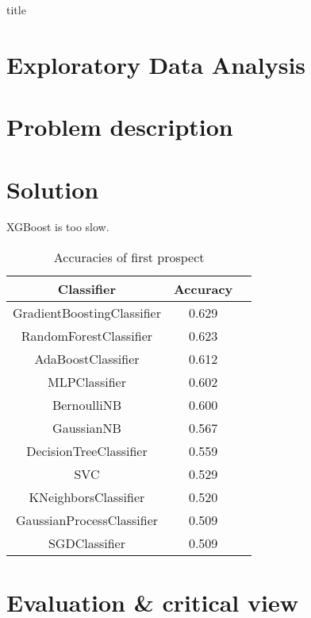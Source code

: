 \documentclass[12pt]{article}
\begin{document}
{title}


\tableofcontents
\listoffigures
\listoftables

{}

\section{Exploratory Data Analysis}
\section{Problem description}
\section{Solution}
XGBoost is too slow.

\begin{table}[h!]
    \centering
    \begin{tabular}{ccc}
        \toprule
        \textbf{Classifier}        & \textbf{Accuracy} \\ \midrule
        GradientBoostingClassifier & 0.629             \\
        RandomForestClassifier     & 0.623             \\
        AdaBoostClassifier         & 0.612             \\
        MLPClassifier              & 0.602             \\
        BernoulliNB                & 0.600             \\
        GaussianNB                 & 0.567             \\
        DecisionTreeClassifier     & 0.559             \\
        SVC                        & 0.529             \\
        KNeighborsClassifier       & 0.520             \\
        GaussianProcessClassifier  & 0.509             \\
        SGDClassifier              & 0.509             \\ \bottomrule
    \end{tabular}
    \caption{Accuracies of first prospect}
\end{table}

\section{Evaluation \& critical view}
\end{document}
